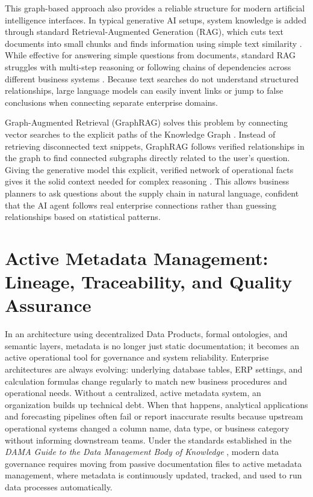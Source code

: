 This graph-based approach also provides a reliable structure for modern artificial intelligence interfaces. 
In typical generative AI setups, system knowledge is added through standard Retrieval-Augmented Generation (RAG), which cuts text documents into small chunks and finds 
information using simple text similarity \cite{lewis2020retrieval}. While effective for answering simple questions from documents, standard RAG struggles 
with multi-step reasoning or following chains of dependencies across different business systems \cite{edge2024local}. 
Because text searches do not understand structured relationships, large language models can easily invent links or jump to false conclusions when connecting separate enterprise domains.

Graph-Augmented Retrieval (GraphRAG) solves this problem by connecting vector searches to the explicit paths of the Knowledge Graph \cite{edge2024local, hogan2021knowledge}. 
Instead of retrieving disconnected text snippets, GraphRAG follows verified relationships in the graph to find connected subgraphs directly related to the user's question. 
Giving the generative model this explicit, verified network of operational facts gives it the solid context needed for complex reasoning \cite{hilger2026bridging}. 
This allows business planners to ask questions about the supply chain in natural language, confident that the AI agent follows real enterprise connections rather than 
guessing relationships based on statistical patterns.


\section[Active Metadata Management]{Active Metadata Management: Lineage, Traceability, and Quality Assurance}
\label{sec:metadata_management}

In an architecture using decentralized Data Products, formal ontologies, and semantic layers, metadata is no longer just static documentation; 
it becomes an active operational tool for governance and system reliability. Enterprise architectures are always evolving: underlying database tables, ERP settings, 
and calculation formulas change regularly to match new business procedures and operational needs. 
Without a centralized, active metadata system, an organization builds up technical debt. When that happens, analytical applications and forecasting pipelines 
often fail or report inaccurate results because upstream operational systems changed a column name, data type, or business category without informing downstream teams. 
Under the standards established in the \textit{DAMA Guide to the Data Management Body of Knowledge} \cite{dama2024dmbok}, modern data governance requires moving from passive 
documentation files to active metadata management, where metadata is continuously updated, tracked, and used to run data processes automatically.

